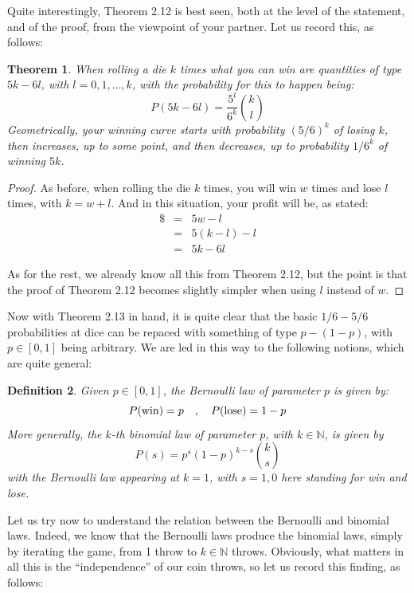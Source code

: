 \documentclass[12pt]{amsbook}
\newtheorem{theorem}{Theorem}[chapter]
\newtheorem{definition}[theorem]{Definition}
\begin{document}
Quite interestingly, Theorem 2.12 is best seen, both at the level of the statement, and of the proof, from the viewpoint of your partner. Let us record this, as follows:

\begin{theorem}
When rolling a die $k$ times what you can win are quantities of type $5k-6l$, with $l=0,1,\ldots,k$, with the probability for this to happen being:
$$P(5k-6l)=\frac{5^l}{6^k}\binom{k}{l}$$
Geometrically, your winning curve starts with probability $(5/6)^k$ of losing $k$, then increases, up to some point, and then decreases, up to probability $1/6^k$ of winning $5k$.
\end{theorem}

\begin{proof}
As before, when rolling the die $k$ times, you will win $w$ times and lose $l$ times, with $k=w+l$. And in this situation, your profit will be, as stated:
\begin{eqnarray*}
\$
&=&5w-l\\
&=&5(k-l)-l\\
&=&5k-6l
\end{eqnarray*}

As for the rest, we already know all this from Theorem 2.12, but the point is that the proof of Theorem 2.12 becomes slightly simpler when using $l$ instead of $w$.
\end{proof}

Now with Theorem 2.13 in hand, it is quite clear that the basic $1/6-5/6$ probabilities at dice can be repaced with something of type $p-(1-p)$, with $p\in[0,1]$ being arbitrary. We are led in this way to the following notions, which are quite general:

\begin{definition}
Given $p\in[0,1]$, the Bernoulli law of parameter $p$ is given by:
$$P({\rm win})=p\quad,\quad P({\rm lose})=1-p$$
More generally, the $k$-th binomial law of parameter $p$, with $k\in\mathbb N$, is given by
$$P(s)=p^s(1-p)^{k-s}\binom{k}{s}$$
with the Bernoulli law appearing at $k=1$, with $s=1,0$ here standing for win and lose.
\end{definition}

Let us try now to understand the relation between the Bernoulli and binomial laws. Indeed, we know that the Bernoulli laws produce the binomial laws, simply by iterating the game, from 1 throw to $k\in\mathbb N$ throws. Obviously, what matters in all this is the ``independence'' of our coin throws, so let us record this finding, as follows: 
\end{document}
